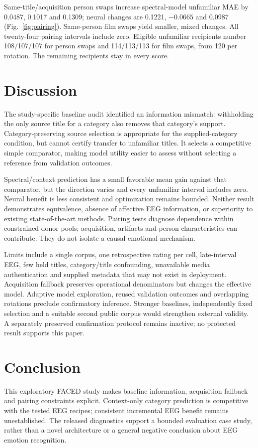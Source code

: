 \documentclass[11pt,a4paper]{article}
\begin{document}
Same-title/acquisition person swaps increase spectral-model unfamiliar MAE by 0.0487, 0.1017 and 0.1309; neural changes are 0.1221, \(-0.0665\) and 0.0987 (Fig.~\ref{fig:pairing}). Same-person film swaps yield smaller, mixed changes. All twenty-four pairing intervals include zero. Eligible unfamiliar recipients number 108/107/107 for person swaps and 114/113/113 for film swaps, from 120 per rotation. The remaining recipients stay in every score.

\section{Discussion}
The study-specific baseline audit identified an information mismatch: withholding the only source title for a category also removes that category's support. Category-preserving source selection is appropriate for the supplied-category condition, but cannot certify transfer to unfamiliar titles. It selects a competitive simple comparator, making model utility easier to assess without selecting a reference from validation outcomes.

Spectral/context prediction has a small favorable mean gain against that comparator, but the direction varies and every unfamiliar interval includes zero. Neural benefit is less consistent and optimization remains bounded. Neither result demonstrates equivalence, absence of affective EEG information, or superiority to existing state-of-the-art methods. Pairing tests diagnose dependence within constrained donor pools; acquisition, artifacts and person characteristics can contribute. They do not isolate a causal emotional mechanism.

Limits include a single corpus, one retrospective rating per cell, late-interval EEG, few held titles, category/title confounding, unavailable media authentication and supplied metadata that may not exist in deployment. Acquisition fallback preserves operational denominators but changes the effective model. Adaptive model exploration, reused validation outcomes and overlapping rotations preclude confirmatory inference. Stronger baselines, independently fixed selection and a suitable second public corpus would strengthen external validity. A separately preserved confirmation protocol remains inactive; no protected result supports this paper.

\section{Conclusion}
This exploratory FACED study makes baseline information, acquisition fallback and pairing constraints explicit. Context-only category prediction is competitive with the tested EEG recipes; consistent incremental EEG benefit remains unestablished. The released diagnostics support a bounded evaluation case study, rather than a novel architecture or a general negative conclusion about EEG emotion recognition.
\end{document}

